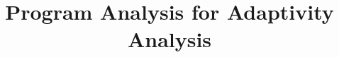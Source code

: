 \documentclass[a4paper,11pt]{article}
\newcommand{\THESYSTEM}{\textsf{AdaptFun}}
\begin{document}
\title{Program Analysis for Adaptivity Analysis}

\author{}

\date{}

\maketitle
%

\clearpage
% 
% 
% 
% 
% 
% 
% 
%
% 
% 
\clearpage
%


\end{document}
